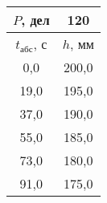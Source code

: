 \begin{tabular}[t]{|c|c|}
\hline
$P$, дел & 120 \\
\hline
$t_{абс}$, с & $h$, мм \\ 
\hline
0,0 & 200,0 \\ 
19,0 & 195,0 \\ 
37,0 & 190,0 \\ 
55,0 & 185,0 \\ 
73,0 & 180,0 \\ 
91,0 & 175,0 \\ 
\hline
\end{tabular}